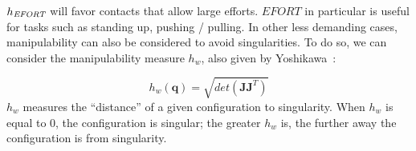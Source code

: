 
$h_{\textrm{\it EFORT}}$ will favor contacts that allow large efforts.
$EFORT$ in particular is useful for tasks such as standing up, pushing / pulling.
In other less demanding cases, manipulability can also be considered to avoid singularities.
To do so, we can consider the manipulability measure $h_{w}$, also given by Yoshikawa~\cite{Yoshikawa1984}:

\begin{equation} \label{ellipsoid}
h_{w}(\mathbf{q}) = \sqrt{det(\mathbf{J}\mathbf{J}^T)}
\end{equation}
$h_{w}$ measures the ``distance'' of a given configuration to singularity. When $h_{w}$ is equal to 0, the configuration is singular;
the greater $h_{w}$ is, the further away the configuration is from singularity.



